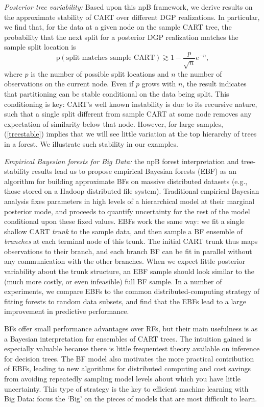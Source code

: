 \documentclass{article}
\begin{document}
\textit{Posterior tree variability:} Based upon this npB framework, we derive
results on the approximate stability of CART  over different DGP realizations.
In particular, we find that, for the data at a given node on the
sample CART tree, the probability that the next split for a posterior
DGP realization  matches the sample split location is
\begin{equation}\label{treestable}
\mathrm{p}\left(\text{split matches sample CART}\right) \gtrsim 1 - \frac{p}{\sqrt{n}} e^{-n},
\end{equation}
where $p$ is the number of possible split locations and $n$ the number of observations on the current node.  Even if $p$ grows with $n$, the result indicates that partitioning can be stable conditional on the data being split.  This conditioning is key: CART's well known instability is due to its recursive nature, such that a single split different from sample CART at some node removes any expectation of similarity  below that node.  However, for  large samples, (\ref{treestable}) implies that we will see little variation at the top hierarchy of  trees in a forest.  We illustrate such stability in our examples.


\textit{Empirical Bayesian forests for Big Data:} the npB forest
interpretation and tree-stability results lead us to propose empirical
Bayesian forests (EBF) as an algorithm for building approximate BFs on massive
distributed datasets (e.g., those stored on a Hadoop distributed file system).
Traditional empirical Bayesian analysis fixes parameters in high levels of a
hierarchical model at their marginal posterior mode, and proceeds to quantify
uncertainty for the rest of the model conditional upon these fixed values.
EBFs work the same way: we fit a single shallow CART \textit{trunk} to the
sample data, and then sample a BF ensemble of \textit{branches} at each
terminal node of this trunk.  The initial CART trunk thus maps observations to
their branch, and each branch BF can be fit in parallel without any
communication with the other branches.  When we expect little posterior
variability about the trunk structure, an EBF sample should look similar to
the (much more costly, or even infeasible) full BF sample.  In a number of
experiments, we compare EBFs to the common distributed-computing strategy of
fitting forests to random data subsets, and find that the EBFs lead to a large
improvement in predictive performance.



BFs offer small performance advantages over RFs, but their main usefulness is
as a Bayesian interpretation for ensembles of CART trees. The intuition gained
is especially valuable because there is little frequentest theory available on
inference for decision trees.  The BF model also motivates the more practical
contribution of EBFs, leading to new algorithms for distributed computing and
cost savings from avoiding repeatedly sampling model levels about which you
have little uncertainty. This type of strategy is the key to efficient machine
learning with Big Data: focus the `Big' on the pieces of models that are most
difficult to learn.
\end{document}
